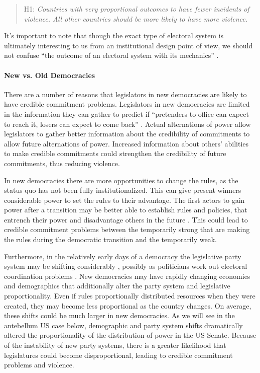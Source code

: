 \documentclass[a4paper]{article}\usepackage[]{graphicx}\usepackage[]{color}
\begin{document}
\begin{quote}
    H1: \emph{Countries with very proportional outcomes to have fewer incidents of violence. All other countries should be more likely to have more violence.}
\end{quote}

It's important to note that though the exact type of electoral system is ultimately interesting to us from an institutional design point of view, we should not confuse ``the outcome of an electoral system with its mechanics'' \citep[][109]{Golder2005}.

\paragraph{New vs. Old Democracies}

There are a number of reasons that legislators in new democracies are likely to have credible commitment problems. Legislators in new democracies are limited in the information they can gather to predict if ``pretenders to office can expect to reach it, losers can expect to come back'' \citep[][36]{Przeworski1991}. Actual alternations of power allow legislators to gather better information about the credibility of commitments to allow future alternations of power. Increased information about others' abilities to make credible commitments could strengthen the credibility of future commitments, thus reducing violence.

In new democracies there are more opportunities to change the rules, as the status quo has not been fully institutionalized. This can give present winners considerable power to set the rules to their advantage. The first actors to gain power after a transition may be better able to establish rules and policies, that entrench their power and disadvantage others in the future \cite[108]{Saideman2002}. This could lead to credible commitment problems between the temporarily strong that are making the rules during the democratic transition and the temporarily weak.

Furthermore, in the relatively early days of a democracy the legislative party system may be shifting considerably \cite[161]{Mainwaring2007b}, possibly as politicians work out electoral coordination problems \citep{cox1997}. New democracies may have rapidly changing economies and demographics that additionally alter the party system and legislative proportionality. Even if rules proportionally distributed resources when they were created, they may become less proportional as the country changes. On average, these shifts could be much larger in new democracies. As we will see in the antebellum US case below, demographic and party system shifts dramatically altered the proportionality of the distribution of power in the US Senate. Because of the instability of new party systems, there is a greater likelihood that legislatures could become disproportional, leading to credible commitment problems and violence.
\end{document}
